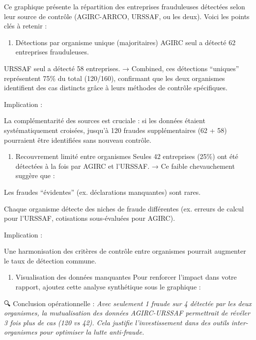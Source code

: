 \documentclass[
]{article}
\providecommand{\tightlist}{%
  \setlength{\itemsep}{0pt}\setlength{\parskip}{0pt}}
\begin{document}
Ce graphique présente la répartition des entreprises frauduleuses
détectées selon leur source de contrôle (AGIRC-ARRCO, URSSAF, ou les
deux). Voici les points clés à retenir :

\begin{enumerate}
\def\labelenumi{\arabic{enumi}.}
\tightlist
\item
  Détections par organisme unique (majoritaires) AGIRC seul a détecté 62
  entreprises frauduleuses.
\end{enumerate}

URSSAF seul a détecté 58 entreprises. → Combined, ces détections
``uniques'' représentent 75\% du total (120/160), confirmant que les
deux organismes identifient des cas distincts grâce à leurs méthodes de
contrôle spécifiques.

Implication :

La complémentarité des sources est cruciale : si les données étaient
systématiquement croisées, jusqu'à 120 fraudes supplémentaires (62 + 58)
pourraient être identifiées sans nouveau contrôle.

\begin{enumerate}
\def\labelenumi{\arabic{enumi}.}
\setcounter{enumi}{1}
\tightlist
\item
  Recouvrement limité entre organismes Seules 42 entreprises (25\%) ont
  été détectées à la fois par AGIRC et l'URSSAF. → Ce faible
  chevauchement suggère que :
\end{enumerate}

Les fraudes ``évidentes'' (ex. déclarations manquantes) sont rares.

Chaque organisme détecte des niches de fraude différentes (ex. erreurs
de calcul pour l'URSSAF, cotisations sous-évaluées pour AGIRC).

Implication :

Une harmonisation des critères de contrôle entre organismes pourrait
augmenter le taux de détection commune.

\begin{enumerate}
\def\labelenumi{\arabic{enumi}.}
\setcounter{enumi}{2}
\tightlist
\item
  Visualisation des données manquantes Pour renforcer l'impact dans
  votre rapport, ajoutez cette analyse synthétique sous le graphique :
\end{enumerate}

🔍 Conclusion opérationnelle : \emph{Avec seulement 1 fraude sur 4
détectée par les deux organismes, la mutualisation des données
AGIRC-URSSAF permettrait de révéler 3 fois plus de cas (120 vs 42). Cela
justifie l'investissement dans des outils inter-organismes pour
optimiser la lutte anti-fraude.}
\end{document}
